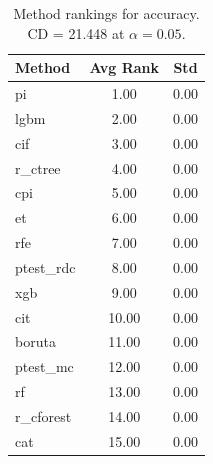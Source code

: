 \begin{table}[h]
\centering
\caption{Method rankings for accuracy. CD = 21.448 at $\alpha=0.05$.}
\label{tab:ranks_accuracy}
\begin{tabular}{lcc}
\toprule
Method & Avg Rank & Std \\
\midrule
pi & 1.00 & 0.00 \\
lgbm & 2.00 & 0.00 \\
cif & 3.00 & 0.00 \\
r_ctree & 4.00 & 0.00 \\
cpi & 5.00 & 0.00 \\
et & 6.00 & 0.00 \\
rfe & 7.00 & 0.00 \\
ptest_rdc & 8.00 & 0.00 \\
xgb & 9.00 & 0.00 \\
cit & 10.00 & 0.00 \\
boruta & 11.00 & 0.00 \\
ptest_mc & 12.00 & 0.00 \\
rf & 13.00 & 0.00 \\
r_cforest & 14.00 & 0.00 \\
cat & 15.00 & 0.00 \\
\bottomrule
\end{tabular}
\end{table}